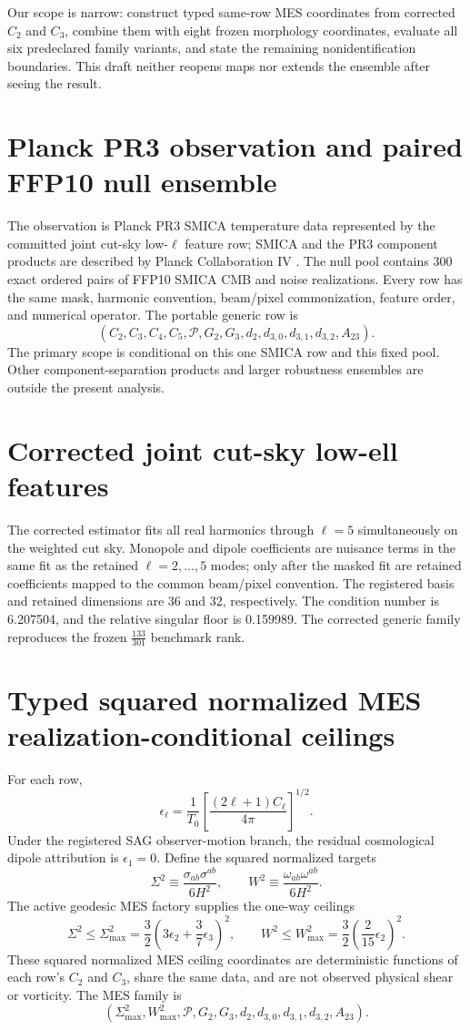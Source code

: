 \documentclass[11pt]{article}
\begin{document}
Our scope is narrow: construct typed same-row MES coordinates from corrected $C_2$ and $C_3$, combine them with eight frozen morphology coordinates, evaluate all six predeclared family variants, and state the remaining nonidentification boundaries. This draft neither reopens maps nor extends the ensemble after seeing the result.

\section{Planck PR3 observation and paired FFP10 null ensemble}
The observation is Planck PR3 SMICA temperature data represented by the committed joint cut-sky low-$\ell$ feature row; SMICA and the PR3 component products are described by Planck Collaboration IV \cite{Planck2018IV}. The null pool contains 300 exact ordered pairs of FFP10 SMICA CMB and noise realizations. Every row has the same mask, harmonic convention, beam/pixel commonization, feature order, and numerical operator. The portable generic row is
\[
(C_2,C_3,C_4,C_5,\mathcal P,G_2,G_3,d_2,d_{3,0},d_{3,1},d_{3,2},A_{23}).
\]
The primary scope is conditional on this one SMICA row and this fixed pool. Other component-separation products and larger robustness ensembles are outside the present analysis.

\section{Corrected joint cut-sky low-ell features}
The corrected estimator fits all real harmonics through $\ell=5$ simultaneously on the weighted cut sky. Monopole and dipole coefficients are nuisance terms in the same fit as the retained $\ell=2,\ldots,5$ modes; only after the masked fit are retained coefficients mapped to the common beam/pixel convention. The registered basis and retained dimensions are 36 and 32, respectively. The condition number is 6.207504, and the relative singular floor is 0.159989. The corrected generic family reproduces the frozen $\frac{133}{301}$ benchmark rank.

\section{Typed squared normalized MES realization-conditional ceilings}
For each row,
\[
\epsilon_\ell=\frac{1}{T_0}\left[\frac{(2\ell+1)C_\ell}{4\pi}\right]^{1/2}.
\]
Under the registered SAG observer-motion branch, the residual cosmological dipole attribution is $\epsilon_1=0$. Define the squared normalized targets
\[
\Sigma^2\equiv\frac{\sigma_{ab}\sigma^{ab}}{6H^2},
\qquad
W^2\equiv\frac{\omega_{ab}\omega^{ab}}{6H^2}.
\]
The active geodesic MES factory supplies the one-way ceilings
\[
\Sigma^2\leq\Sigma^2_{\max}=\frac32\left(3\epsilon_2+\frac37\epsilon_3\right)^2,
\qquad
W^2\leq W^2_{\max}=\frac32\left(\frac{2}{15}\epsilon_2\right)^2.
\]
These squared normalized MES ceiling coordinates are deterministic functions of each row's $C_2$ and $C_3$, share the same data, and are not observed physical shear or vorticity. The MES family is
\[
(\Sigma^2_{\max},W^2_{\max},\mathcal P,G_2,G_3,d_2,d_{3,0},d_{3,1},d_{3,2},A_{23}).
\]
\end{document}
